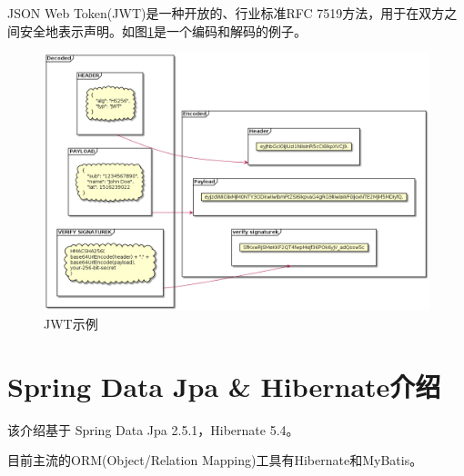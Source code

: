 JSON Web Token(JWT)是一种开放的、行业标准RFC 7519方法，用于在双方之间安全地表示声明。如图\ref{jwt}是一个编码和解码的例子。
\begin{figure}[H]
  \centering
  \includegraphics[scale = 0.4]{out/uml/部署图/JWT/JWT.png}
  \caption{\song\wuhao JWT示例}
  \label{jwt}
\end{figure}

\section{Spring Data Jpa \& Hibernate介绍}

该介绍基于 Spring Data Jpa 2.5.1，Hibernate 5.4。

目前主流的ORM(Object/Relation Mapping)工具有Hibernate和MyBatis。

